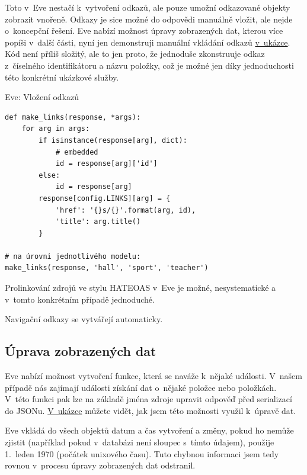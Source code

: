 Toto v~Eve nestačí k~vytvoření odkazů, ale pouze umožní odkazované objekty zobrazit vnořeně. Odkazy je sice možné do odpovědi manuálně vložit, ale nejde o~koncepční řešení. Eve nabízí možnost úpravy zobrazených dat, kterou více popíši v~další části, nyní jen demonstruji manuální vkládání odkazů \protect\hyperlink{code:eve:links2}{v~ukázce}. Kód není příliš složitý, ale to jen proto, že jednoduše zkonstruuje odkaz z~číselného identifikátoru a názvu položky, což je možné jen díky jednoduchosti této konkrétní ukázkové služby.

\begin{listing}[htbp]
\caption{{\label{code:eve:links2}Eve: Vložení odkazů}}
\begin{verbatim}
def make_links(response, *args):
    for arg in args:
        if isinstance(response[arg], dict):
            # embedded
            id = response[arg]['id']
        else:
            id = response[arg]
        response[config.LINKS][arg] = {
            'href': '{}s/{}'.format(arg, id),
            'title': arg.title()
        }

# na úrovni jednotlivého modelu:
make_links(response, 'hall', 'sport', 'teacher')
\end{verbatim}
\end{listing}

Prolinkování zdrojů ve stylu HATEOAS v~Eve je možné, nesystematické a v~tomto konkrétním případě jednoduché.

Navigační odkazy se vytvářejí automaticky.

\subsection{Úprava zobrazených dat}\label{uxfaprava-zobrazenuxfdch-dat}

Eve nabízí možnost vytvoření funkce, která se naváže k~nějaké události. V~našem případě nás zajímají události získání dat o~nějaké položce nebo položkách. V~této funkci pak lze na základě jména zdroje upravit odpověď před serializací do JSONu. \protect\hyperlink{code:eve:modify}{V~ukázce} můžete vidět, jak jsem této možnosti využil k~úpravě dat.

Eve vkládá do všech objektů datum a čas vytvoření a změny, pokud ho nemůže zjistit (například pokud v~databázi není sloupec s~tímto údajem), použije 1.~leden 1970 (počátek unixového času). Tuto chybnou informaci jsem tedy rovnou v~procesu úpravy zobrazených dat odstranil.

